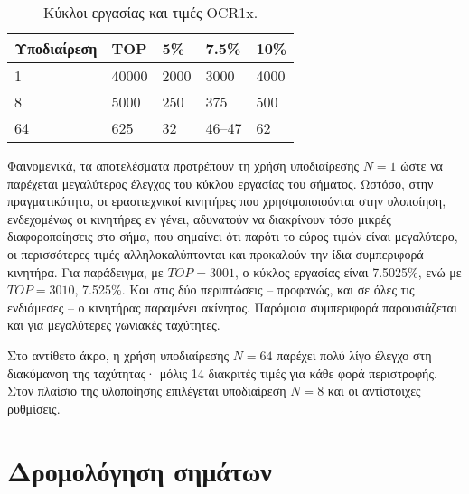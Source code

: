 \begin{table}
    \caption{Κύκλοι εργασίας και τιμές OCR1x. \label{tab:motor:prescaler}}
\begin{center}
\begin{tabu} spread 0pt {*5{X[-1r]}}

    \rowfont\bfseries
    Υποδιαίρεση &   TOP &      5\% &   7.5\% &   10\%                         \\
     & 40000 &     2000 &    3000 &   4000                         \\
              8 &  5000 &      250 &     375 &    500                         \\
             64 &   625 &       32 &  46--47 &     62                         \\
\end{tabu}
\end{center}\end{table}

Φαινομενικά, τα αποτελέσματα προτρέπουν τη χρήση υποδιαίρεσης $N = 1$ ώστε να
παρέχεται μεγαλύτερος έλεγχος του κύκλου εργασίας του σήματος. Ωστόσο, στην
πραγματικότητα, οι ερασιτεχνικοί κινητήρες που χρησιμοποιούνται στην υλοποίηση,
ενδεχομένως οι κινητήρες εν γένει, αδυνατούν να διακρίνουν τόσο μικρές
διαφοροποίησεις στο σήμα, που σημαίνει ότι παρότι το εύρος τιμών είναι
μεγαλύτερο, οι περισσότερες τιμές αλληλοκαλύπτονται και προκαλούν την ίδια
συμπεριφορά κινητήρα. Για παράδειγμα, με $TOP = 3001$, ο κύκλος εργασίας είναι
7.5025\%, ενώ με $TOP = 3010$, 7.525\%. Και στις δύο περιπτώσεις -- προφανώς,
και σε όλες τις ενδιάμεσες -- ο κινητήρας παραμένει ακίνητος. Παρόμοια
συμπεριφορά παρουσιάζεται και για μεγαλύτερες γωνιακές ταχύτητες.

Στο αντίθετο άκρο, η χρήση υποδιαίρεσης $N = 64$ παρέχει πολύ λίγο έλεγχο στη
διακύμανση της ταχύτητας· μόλις 14 διακριτές τιμές για κάθε φορά περιστροφής.
Στον πλαίσιο της υλοποίησης επιλέγεται υποδιαίρεση $N = 8$ και οι αντίστοιχες
ρυθμίσεις.



\section{Δρομολόγηση σημάτων}
\label{sec:motor:routing}

%

